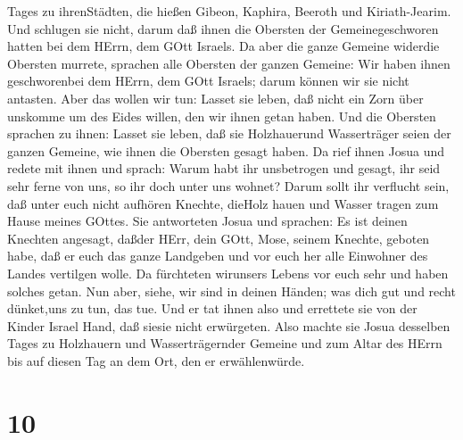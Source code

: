 Tages zu ihrenStädten, die hießen Gibeon, Kaphira, Beeroth und
Kiriath-Jearim.  Und schlugen sie nicht, darum daß ihnen
die Obersten der Gemeinegeschworen hatten bei dem HErrn, dem GOtt
Israels. Da aber die ganze Gemeine widerdie Obersten murrete,
 sprachen alle Obersten der ganzen Gemeine: Wir haben ihnen
geschworenbei dem HErrn, dem GOtt Israels; darum können wir sie nicht
antasten.  Aber das wollen wir tun: Lasset sie leben, daß
nicht ein Zorn über unskomme um des Eides willen, den wir ihnen getan
haben.  Und die Obersten sprachen zu ihnen: Lasset sie
leben, daß sie Holzhauerund Wasserträger seien der ganzen Gemeine, wie
ihnen die Obersten gesagt haben.  Da rief ihnen Josua und
redete mit ihnen und sprach: Warum habt ihr unsbetrogen und gesagt, ihr
seid sehr ferne von uns, so ihr doch unter uns wohnet? 
Darum sollt ihr verflucht sein, daß unter euch nicht aufhören Knechte,
dieHolz hauen und Wasser tragen zum Hause meines GOttes. 
Sie antworteten Josua und sprachen: Es ist deinen Knechten angesagt,
daßder HErr, dein GOtt, Mose, seinem Knechte, geboten habe, daß er euch
das ganze Landgeben und vor euch her alle Einwohner des Landes vertilgen
wolle. Da fürchteten wirunsers Lebens vor euch sehr und haben solches
getan.  Nun aber, siehe, wir sind in deinen Händen; was
dich gut und recht dünket,uns zu tun, das tue.  Und er tat
ihnen also und errettete sie von der Kinder Israel Hand, daß siesie
nicht erwürgeten.  Also machte sie Josua desselben Tages zu
Holzhauern und Wasserträgernder Gemeine und zum Altar des HErrn bis auf
diesen Tag an dem Ort, den er erwählenwürde.

\hypertarget{section-9}{%
\section{10}\label{section-9}}

